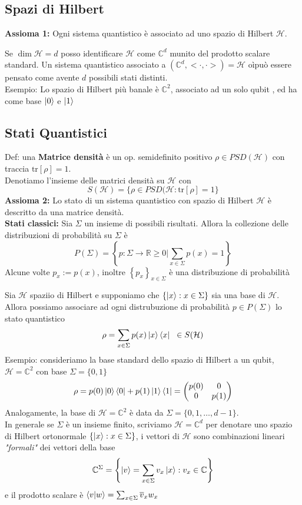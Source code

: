 \documentclass{report}
\begin{document}
\subsection{Spazi di Hilbert}
\textbf{Assioma 1:} Ogni sistema quantistico è associato ad uno spazio di Hilbert $\mathcal{H}$.

\medskip
Se $\dim \mathcal{H} = d$ posso identificare $\mathcal{H}$ come $\mathbb{C}^d$ munito del prodotto scalare standard.
Un sistema quantistico associato a $\left(\mathbb{C}^d,<\cdot,\cdot> \right)= \mathcal{H}$ oìpuò essere pensato come avente $d$ possibili stati distinti.
\\Esempio: Lo spazio di Hilbert più banale è $\mathbb{C}^2$, associato ad un solo qubit , ed ha come base $\ket{0}$ e $\ket{1}$
\subsection{Stati Quantistici}
Def: una \textbf{Matrice densità} è un op. semidefinito positivo $\rho \in \textit{PSD}(\mathcal{H})$ con traccia $\text{tr}[\rho]=1$.
\\Denotiamo l'insieme delle matrici densità su $\mathcal{H}$ con $$S(\mathcal{H})=\{\rho \in\textit{PSD}(\mathcal{H}:\text{tr}[\rho]=1\}$$
\textbf{Assioma 2:} Lo stato di un sistema quantistico con spazio di Hilbert $\mathcal{H}$ è descritto da una matrice densità.
\\ \textbf{Stati classici:} Sia $\Sigma$ un insieme di possibili risultati. Allora la collezione delle distribuzioni di probabilità su $\Sigma$ è $$P(\Sigma)=\left\{p : \Sigma\rightarrow\mathbb{R}\ge0|\sum_{x \in \Sigma}p(x)=1\right\}$$
Alcune volte $p_x:= p(x)$, inoltre $\left\{p_x \right\}_{x\in \Sigma}$ è una distribuzione di probabilità

\newpage
Sia $\mathcal{H}$ spaziio di Hilbert e supponiamo che $\left\{ \ket{x}:x \in \Sigma \right\}$ sia una base di $\mathcal{H}$.
Allora possiamo associare ad ogni distrubuzione di probabilità $p \in P(\Sigma)$ lo stato quantistico
$$\rho  = \sum_{x \in \Sigma} p(x)\ket{x}\bra{x} \hspace{0.2cm} \in S(\mathcal{H})$$
Esempio: consideriamo la base standard dello spazio di Hilbert a un qubit, $\mathcal{H}= \mathbb{C}^2$ con base $\Sigma = \{0,1\}$
$$\rho = p(0) \ket{0}\bra{0}+p(1) \ket{1}\bra{1}=
\begin{pmatrix}
    p(0) & 0\\
    0 & p(1) \\
\end{pmatrix}
$$
Analogamente, la base di $\mathcal{H} = \mathbb{C}^2$ è data da $\Sigma = \{0,1,\dots,d-1\}$.
\\In generale se $\Sigma$ è un insieme finito, scriviamo $\mathcal{H}= \mathbb{C}^d$ per denotare uno spazio di Hilbert ortonormale $\left\{ \ket{x}:x \in \Sigma  \right\}$, i vettori di $\mathcal{H}$ sono combinazioni lineari \textit{"formali"} dei vettori della base
$$\mathbb{C}^\Sigma = \left\{ \ket{v} = \sum_{x\in \Sigma} v_x \ket{x}:v_x \in \mathbb{C}\right\}$$
e il prodotto scalare è $\braket{v|w}=\sum_{x\in \Sigma} \overline{v}_x w_x$
\end{document}
